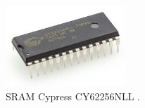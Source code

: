 \begin{figure}[tph!]
    \centerline{\includegraphics[width={0.4\textwidth}]{images/cy62256nll}}
    \caption{SRAM Cypress CY62256NLL \cite{CY62256NLL}.}
    \label{fig:CY62256NLL}
\end{figure}

%
%

